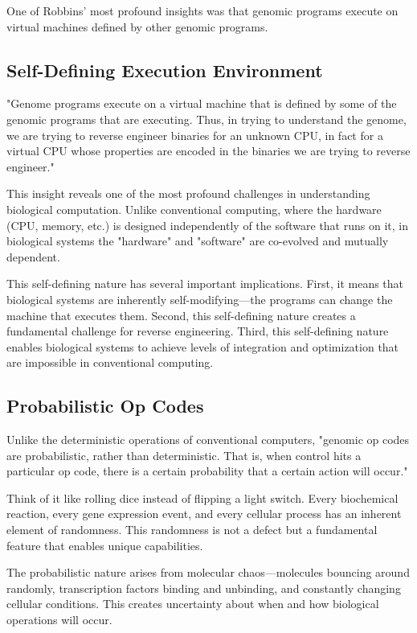 \documentclass[11pt]{article}
\begin{document}
One of Robbins' most profound insights was that genomic programs execute on virtual machines defined by other genomic programs.

\subsection{Self-Defining Execution Environment}

"Genome programs execute on a virtual machine that is defined by some of the genomic programs that are executing. Thus, in trying to understand the genome, we are trying to reverse engineer binaries for an unknown CPU, in fact for a virtual CPU whose properties are encoded in the binaries we are trying to reverse engineer."

This insight reveals one of the most profound challenges in understanding biological computation. Unlike conventional computing, where the hardware (CPU, memory, etc.) is designed independently of the software that runs on it, in biological systems the "hardware" and "software" are co-evolved and mutually dependent.

This self-defining nature has several important implications. First, it means that biological systems are inherently self-modifying—the programs can change the machine that executes them. Second, this self-defining nature creates a fundamental challenge for reverse engineering. Third, this self-defining nature enables biological systems to achieve levels of integration and optimization that are impossible in conventional computing.

\subsection{Probabilistic Op Codes}

Unlike the deterministic operations of conventional computers, "genomic op codes are probabilistic, rather than deterministic. That is, when control hits a particular op code, there is a certain probability that a certain action will occur."

Think of it like rolling dice instead of flipping a light switch. Every biochemical reaction, every gene expression event, and every cellular process has an inherent element of randomness. This randomness is not a defect but a fundamental feature that enables unique capabilities.

The probabilistic nature arises from molecular chaos—molecules bouncing around randomly, transcription factors binding and unbinding, and constantly changing cellular conditions. This creates uncertainty about when and how biological operations will occur.
\end{document}
